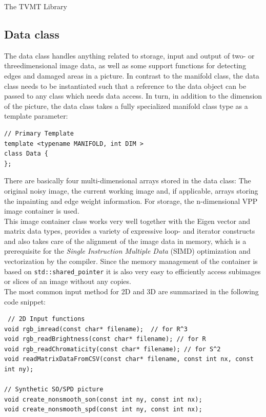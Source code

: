 \begin{chapter}{The TVMT Library}
\subsection{Data class} %
\label{sub:Data class}
The data class handles anything related to storage, input and output of two- or threedimensional image data, as well as some support functions for detecting edges and damaged areas in a picture.
In contrast to the manifold class, the data class needs to be instantiated such that a reference to the data object can be passed to any class which needs data access. In turn, in addition
to the dimension of the picture, the data class takes a fully specialized manifold class type as a template parameter:

\cppinline
\begin{lstlisting}
// Primary Template
template <typename MANIFOLD, int DIM >
class Data {
};    
\end{lstlisting}

There are basically four multi-dimensional arrays stored in the data class: The original noisy image, the current working image and, if applicable, arrays storing the inpainting
and edge weight information. For storage, the n-dimensional VPP \cite{VPP} image container is used.\\

This image container class works very well together with the Eigen vector and matrix data types, provides a variety of expressive loop- and iterator constructs and also takes care
of the alignment of the image data in memory, which is a prerequisite for the \textit{Single Instruction Multiple Data} (SIMD) optimization and vectorization by the compiler.
Since the memory management of the container is based on \texttt{std::shared\_pointer} it is also very easy to efficiently access subimages or slices of an image without any copies.\\

The most common input method for 2D and 3D are summarized in the following code snippet:
\cppinline
\begin{lstlisting}
 // 2D Input functions
void rgb_imread(const char* filename);	// for R^3
void rgb_readBrightness(const char* filename); // for R
void rgb_readChromaticity(const char* filename); // for S^2
void readMatrixDataFromCSV(const char* filename, const int nx, const int ny);

// Synthetic SO/SPD picture 
void create_nonsmooth_son(const int ny, const int nx);
void create_nonsmooth_spd(const int ny, const int nx);
 

\end{lstlisting}
\end{chapter}
